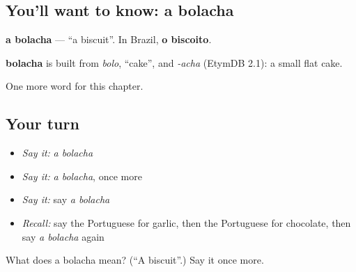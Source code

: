 \subsection*{You'll want to know: a bolacha}
\textbf{a bolacha} — \textquotedblleft{}a biscuit\textquotedblright{}. In Brazil, \textbf{o biscoito}.

\begin{cousinweb}
\textbf{bolacha} is built from \emph{bolo}, \textquotedblleft{}cake\textquotedblright{}, and \emph{-acha} (EtymDB 2.1): a small flat cake.
\end{cousinweb}

\begin{grammarlens}[title={What you've built}]
One more word for this chapter.
\end{grammarlens}

\subsection*{Your turn}
\begin{itemize}
\raggedright
  \item \emph{Say it:} \emph{a bolacha}
  \item \emph{Say it:} \emph{a bolacha}, once more
  \item \emph{Say it:} say \emph{a bolacha}
  \item \emph{Recall:} say the Portuguese for garlic, then the Portuguese for chocolate, then say \emph{a bolacha} again
\end{itemize}

\begin{tcolorbox}[breakable,colback=teal!4,colframe=teal!35!black,title={Before you move on}]
What does a bolacha mean? (\textquotedblleft{}A biscuit\textquotedblright{}.) Say it once more.
\end{tcolorbox}
